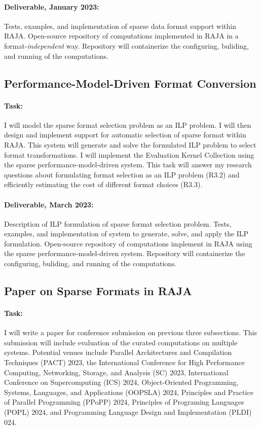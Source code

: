 \documentclass{article}
\begin{document}
\paragraph{Deliverable, January 2023:} 
Tests, examples, and implementation of sparse data format support within RAJA. 
Open-source repository of computations implemented in RAJA in a format-\textit{independent} way.
Repository will containerize the configuring, buliding, and running of the computations. 

\subsection{Performance-Model-Driven Format Conversion}

\paragraph{Task:}
I will model the sparse format selection problem as an ILP problem.
I will then design and implement support for automatic selection of sparse format within RAJA.
This system will generate and solve the formulated ILP problem to select format transformations.
I will implement the Evaluation Kernel Collection using the sparse performance-model-driven system.
This task will answer my research questions about formulating format selection as an ILP problem (R3.2) and efficiently estimating the cost of different format choices (R3.3).

\paragraph{Deliverable, March 2023:}
Description of ILP formulation of sparse format selection problem.
Tests, examples, and implementation of system to generate, solve, and apply the ILP formulation.
Open-source repository of computations implement in RAJA using the sparse performance-model-driven system.
Repository will containerize the configuring, buliding, and running of the computations. 

\subsection{Paper on Sparse Formats in RAJA}

\paragraph{Task:}
I will write a paper for conference submission on previous three subsections. 
This submission will include evaluation of the curated computations on multiple systems.
Potential venues include Parallel Architectures and Compilation Techniques (PACT) 2023, the International Conference for High Performance Computing, Networking, Storage, and Analysis (SC) 2023, International Conference on Supercomputing (ICS) 2024,  Object-Oriented Programming, Systems, Languages, and Applications (OOPSLA) 2024, Principles and Practice of Parallel Programming (PPoPP) 2024, Principles of Programing Languages (POPL) 2024, and Programming Language Design and Implementation (PLDI) 024.
\end{document}
